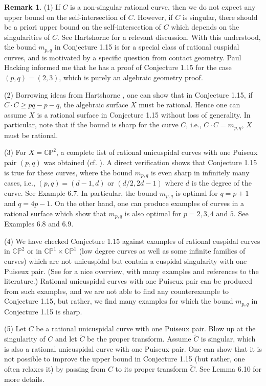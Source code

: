 \documentclass[11pt]{amsart}
\theoremstyle{plain}
\numberwithin{theorem}{section}
\theoremstyle{definition}
\newtheorem{remark}[theorem]{Remark}
\newcommand{\C}{{\mathbb C}}
\renewcommand{\P}{{\mathbb P}}
\begin{document}
\begin{remark}
(1) If $C$ is a non-singular rational curve, then we do not expect any upper bound on the self-intersection of $C$. However, if $C$ is singular, there should be a priori upper bound on the self-intersection of $C$ which depends on the singularities of $C$. See Hartshorne \cite{Hartsh} for a relevant discussion. With this understood, the bound $m_{p,q}$ in 
Conjecture 1.15 is for a special class of rational cuspidal curves, and is motivated by a specific question from contact geometry. Paul Hacking informed me that he has a proof of Conjecture 1.15 for the case $(p,q)=(2,3)$, which is purely an algebraic geometry proof. 

(2) Borrowing ideas from Hartshorne \cite{Hartsh}, one can show that in Conjecture 1.15, if 
$C\cdot C\geq pq-p-q$,  the algebraic surface $X$ must be rational. Hence one can assume $X$ is a rational surface in Conjecture 1.15 without loss of generality. In particular, note that if the bound is sharp for the curve $C$, i.e.,  $C\cdot C=m_{p,q}$, $X$ must be rational. 

(3) For $X=\C\P^2$, a complete list of rational unicuspidal curves with one Puiseux pair $(p,q)$ 
was obtained (cf. \cite{F}). A direct verification shows that Conjecture 1.15 is true for these curves, 
where the bound $m_{p,q}$ is even sharp in infinitely many cases, i.e., $(p,q)=(d-1,d)$ or $(d/2,2d-1)$ where $d$ is the degree of the curve. See Example 6.7. In particular, the bound $m_{p,q}$ is optimal for $q=p+1$ and $q=4p-1$. On the other hand, one can produce examples of curves in a rational surface which show that $m_{p,q}$ is also optimal for $p=2,3,4$ and $5$. See Examples 6.8 and 6.9. 

(4) We have checked Conjecture 1.15 against examples of rational cuspidal curves in $\C\P^2$ or in 
$\C\P^1\times \C\P^1$ (low degree curves as well as some infinite families of curves) which are not unicuspidal but contain a cuspidal singularity with one Puiseux pair. (See \cite{Moe} for a nice overview, with many examples and references to the literature.) Rational unicuspidal curves with one Puiseux pair can be produced from such examples, and we are not able to find any counterexample to Conjecture 1.15, but rather, we find many examples for which the bound $m_{p,q}$ in Conjecture 1.15 is sharp. 

(5) Let $C$ be a rational unicuspidal curve with one Puiseux pair. Blow up at the singularity of $C$ 
and let $\tilde{C}$ be the proper transform. Assume $\tilde{C}$ is singular, which is also a rational unicuspidal curve with one Puiseux pair. One can show that it is not possible to improve the upper bound in Conjecture 1.15 (but rather, one often relaxes it) by passing from $C$ to its proper transform $\tilde{C}$. See Lemma 6.10 for more details. 


\end{remark}
\end{document}
